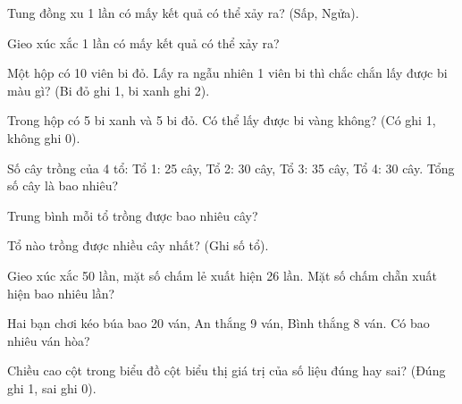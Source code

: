 \begin{ex}
Tung đồng xu 1 lần có mấy kết quả có thể xảy ra? (Sấp, Ngửa).
\end{ex}

\begin{ex}
Gieo xúc xắc 1 lần có mấy kết quả có thể xảy ra?
\end{ex}

\begin{ex}
Một hộp có 10 viên bi đỏ. Lấy ra ngẫu nhiên 1 viên bi thì chắc chắn lấy được bi màu gì? (Bi đỏ ghi 1, bi xanh ghi 2).
\end{ex}

\begin{ex}
Trong hộp có 5 bi xanh và 5 bi đỏ. Có thể lấy được bi vàng không? (Có ghi 1, không ghi 0).
\end{ex}

\begin{ex}
Số cây trồng của 4 tổ: Tổ 1: 25 cây, Tổ 2: 30 cây, Tổ 3: 35 cây, Tổ 4: 30 cây. Tổng số cây là bao nhiêu?
\end{ex}

\begin{ex}
Trung bình mỗi tổ trồng được bao nhiêu cây?
\end{ex}

\begin{ex}
Tổ nào trồng được nhiều cây nhất? (Ghi số tổ).
\end{ex}

\begin{ex}
Gieo xúc xắc 50 lần, mặt số chấm lẻ xuất hiện 26 lần. Mặt số chấm chẵn xuất hiện bao nhiêu lần?
\end{ex}

\begin{ex}
Hai bạn chơi kéo búa bao 20 ván, An thắng 9 ván, Bình thắng 8 ván. Có bao nhiêu ván hòa?
\end{ex}

\begin{ex}
Chiều cao cột trong biểu đồ cột biểu thị giá trị của số liệu đúng hay sai? (Đúng ghi 1, sai ghi 0).
\end{ex}

